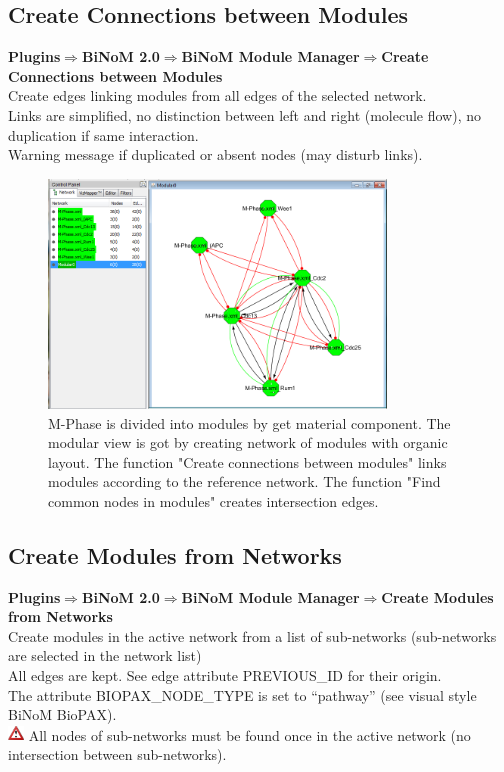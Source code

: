 \subsection{Create Connections between Modules}
\textbf{Plugins$\Rightarrow$BiNoM 2.0$\Rightarrow$BiNoM Module Manager$\Rightarrow$Create Connections between Modules}\\
Create edges linking modules from all edges of the selected network.\\
Links are simplified, no distinction between left and right (molecule flow), no duplication if same interaction.\\
Warning message if duplicated or absent nodes (may disturb links).
\begin{figure}
\centering
\includegraphics[width=0.8\textwidth]{graphics/M-Phase_Material_Modular}
\caption{M-Phase is divided into modules by get material component. The modular view is got by creating network of modules with organic layout. The function "Create connections between modules" links modules according to the reference network. The function "Find common nodes in modules" creates intersection edges. }
\label{M-Phase_Material_Modular}
\end{figure}

\subsection{Create Modules from Networks}
\textbf{Plugins$\Rightarrow$BiNoM 2.0$\Rightarrow$BiNoM Module Manager$\Rightarrow$Create Modules from Networks}\\
Create modules in the active network from a list of sub-networks (sub-networks are selected in the network list)\\
All edges are kept. See edge attribute PREVIOUS\_ID for their origin.\\
The attribute BIOPAX\_NODE\_TYPE is set to “pathway” (see visual style BiNoM BioPAX).\\
\includegraphics[width=12pt,height=12pt]{graphics/warning} All nodes of sub-networks must be found once in the active network (no intersection between sub-networks).

